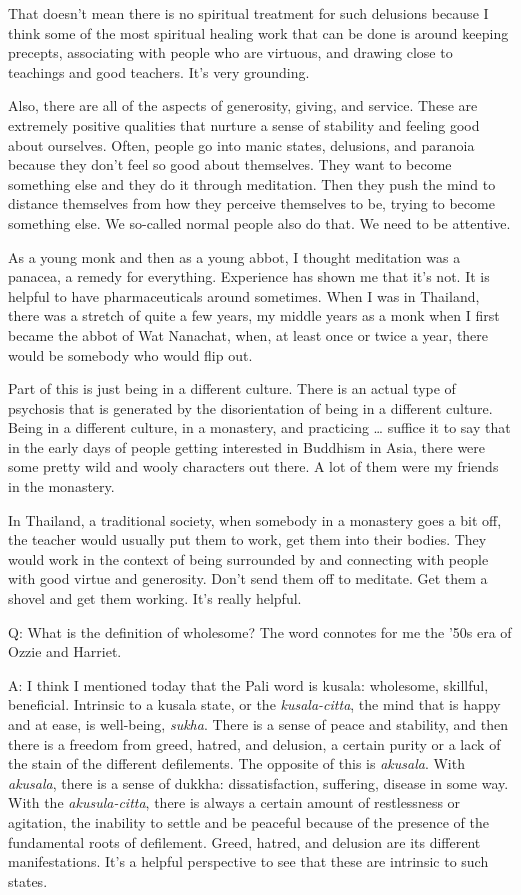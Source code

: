 That doesn’t mean there is no spiritual treatment for such delusions
because I think some of the most spiritual healing work that can be done
is around keeping precepts, associating with people who are virtuous,
and drawing close to teachings and good teachers. It’s very grounding.

Also, there are all of the aspects of generosity, giving, and service.
These are extremely positive qualities that nurture a sense of stability
and feeling good about ourselves. Often, people go into manic states,
delusions, and paranoia because they don’t feel so good about
themselves. They want to become something else and they do it through
meditation. Then they push the mind to distance themselves from how they
perceive themselves to be, trying to become something else. We so-called
normal people also do that. We need to be attentive.

As a young monk and then as a young abbot, I thought meditation was a
panacea, a remedy for everything. Experience has shown me that it’s not.
It is helpful to have pharmaceuticals around sometimes. When I was in
Thailand, there was a stretch of quite a few years, my middle years as a
monk when I first became the abbot of Wat Nanachat, when, at least once
or twice a year, there would be somebody who would flip out.

Part of this is just being in a different culture. There is an actual
type of psychosis that is generated by the disorientation of being in a
different culture. Being in a different culture, in a monastery, and
practicing \ldots{} suffice it to say that in the early days of people
getting interested in Buddhism in Asia, there were some pretty wild and
wooly characters out there. A lot of them were my friends in the
monastery.

In Thailand, a traditional society, when somebody in a monastery goes a
bit off, the teacher would usually put them to work, get them into their
bodies. They would work in the context of being surrounded by and
connecting with people with good virtue and generosity. Don’t send them
off to meditate. Get them a shovel and get them working. It’s really
helpful.

\qaspace
Q: What is the definition of wholesome? The word connotes for me the
’50s era of Ozzie and Harriet.

\qaspace
A: I think I mentioned today that the Pali word is kusala: wholesome,
skillful, beneficial. Intrinsic to a kusala state, or the
\emph{kusala-citta}, the mind that is happy and at ease, is well-being,
\emph{sukha}. There is a sense of peace and stability, and then there is
a freedom from greed, hatred, and delusion, a certain purity or a lack
of the stain of the different defilements. The opposite of this is
\emph{akusala}. With \emph{akusala}, there is a sense of dukkha:
dissatisfaction, suffering, disease in some way. With the
\emph{akusula-citta}, there is always a certain amount of restlessness
or agitation, the inability to settle and be peaceful because of the
presence of the fundamental roots of defilement. Greed, hatred, and
delusion are its different manifestations. It’s a helpful perspective to
see that these are intrinsic to such states.

